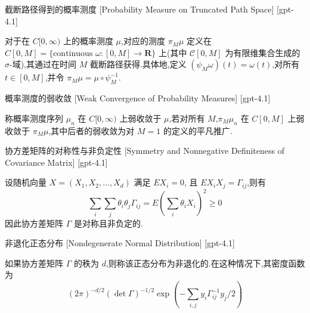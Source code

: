 \documentclass[UTF8]{ctexart}
\begin{document}
    
    
    \begin{dfn}
        {截断路径得到的概率测度}
        [Probability Measure on Truncated Path Space]
        [gpt-4.1]
        
对于在 $C[0, \infty )$ 上的概率测度 $\mu$,对应的测度 $\pi_{ M }\mu$ 定义在 $C[0, M] = \{ \text{continuous } \omega : [0, M] \to \mathbf{R} \}$ 上(其中 $\mathcal{C}[0, M]$ 为有限维集合生成的 $\sigma$-域),其通过在时间 $M$ 截断路径获得.具体地,定义 $(\psi_{ M }\omega)(t) = \omega(t)$,对所有 $t \in [0, M]$,并令 $\pi_{ M } \mu = \mu \circ \psi_{ M }^{ -1 }$.

    \end{dfn}
    
    
    
    \begin{dfn}
        {概率测度的弱收敛}
        [Weak Convergence of Probability Measures]
        [gpt-4.1]
        
称概率测度序列 $\mu_{ n }$ 在 $C[0, \infty )$ 上弱收敛于 $\mu$,若对所有 $M$,$\pi_{ M } \mu_{ n }$ 在 $C[0, M]$ 上弱收敛于 $\pi_{ M } \mu$,其中后者的弱收敛为对 $M = 1$ 的定义的平凡推广.

    \end{dfn}
    
    
    
    \begin{dfn}
        {协方差矩阵的对称性与非负定性}
        [Symmetry and Nonnegative Definiteness of Covariance Matrix]
        [gpt-4.1]
        
设随机向量 $X = (X_1, X_2, \ldots, X_d)$ 满足 $E X_i = 0$, 且 $E X_i X_j = \Gamma_{ij}$,则有
\[
\sum_{i} \sum_{j} \theta_i \theta_j \Gamma_{ij} = E\left( \sum_{i} \theta_i X_i \right)^2 \geq 0
\]
因此协方差矩阵 $\Gamma$ 是对称且非负定的.

    \end{dfn}
    
    
    
    \begin{dfn}
        {非退化正态分布}
        [Nondegenerate Normal Distribution]
        [gpt-4.1]
        
如果协方差矩阵 $\Gamma$ 的秩为 $d$,则称该正态分布为非退化的.在这种情况下,其密度函数为
\[
(2\pi)^{-d/2} (\operatorname{det} \Gamma)^{-1/2} \exp\left( - \sum_{i,j} y_i \Gamma_{ij}^{-1} y_j / 2 \right )
\]

    \end{dfn}
    
\end{document}
